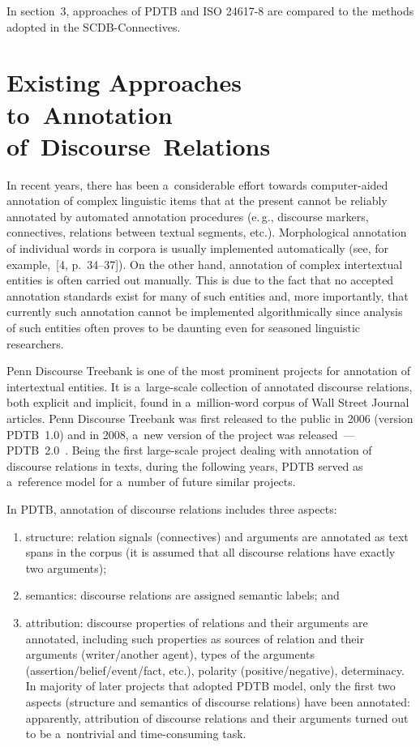 \begin{multicols}{2}
 In section~3, approaches of PDTB and ISO 24617-8 are compared to the 
methods adopted in the SCDB-Connectives.
  
  \section{Existing Approaches to~Annotation of~Discourse~Relations}
  
  \noindent
  In recent years, there has been a~considerable effort towards computer-aided 
annotation of complex linguistic items that at the present cannot be reliably annotated 
by automated annotation procedures (e.\,g., discourse markers, connectives, relations 
between textual segments, etc.). Morphological annotation of individual words in 
corpora is usually implemented automatically (see, for example,~[4, p.~34--37]). On the other 
hand, annotation of complex intertextual entities is often carried out manually. This is 
due to the fact that no accepted annotation standards exist for many of such entities 
and, more importantly, that currently such annotation cannot be implemented 
algorithmically since analysis of such entities often proves to be daunting even for 
seasoned linguistic researchers.
  
  Penn Discourse Treebank is one of the most prominent projects for 
annotation of intertextual entities. It is a~large-scale collection of annotated discourse 
relations, both explicit and implicit, found in a~million-word corpus of Wall Street 
Journal articles. Penn Discourse Treebank was first released 
to the public in 2006 (version PDTB~1.0) 
and in 2008, a~new version of the project was released~---  
PDTB~2.0~\cite{5-kr, 6-kr}. Being the first large-scale project dealing with 
annotation of discourse relations in texts, during the following years, PDTB served as 
a~reference model for a~number of future similar projects.
  
  In PDTB, annotation of discourse relations includes three aspects:
  \begin{enumerate}[(1)]
  \item structure: relation signals (connectives) and arguments are annotated as text 
spans in the corpus (it is assumed that all discourse relations have exactly two 
arguments);
  \item semantics: discourse relations are assigned semantic labels; and
  \item attribution: discourse properties of relations and their arguments are 
annotated, including such properties as sources of relation and their arguments 
(writer/another agent), types of the arguments (assertion/belief/event/fact, etc.), 
polarity (positive/negative), determinacy. In majority of later projects that adopted 
PDTB model, only the first two aspects (structure and semantics of discourse 
relations) have been annotated: apparently, attribution of discourse relations and their 
arguments turned out to be a~nontrivial and time-consuming task.
  \end{enumerate}
  

\end{multicols}
